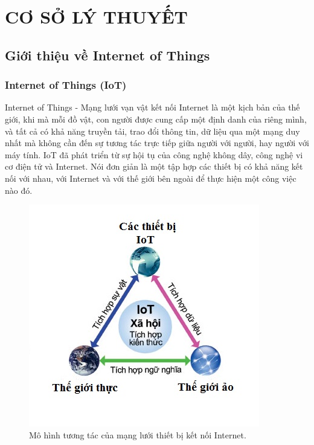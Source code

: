 \documentclass[a4paper,12pt,oneside]{article}
\begin{document}
\section{CƠ SỞ LÝ THUYẾT}

\subsection{Giới thiệu về Internet of Things}

\subsubsection{Internet of Things (IoT)}

\noindent Internet of Things - Mạng lưới vạn vật kết nối Internet là một kịch bản của thế giới, khi mà mỗi đồ vật, con người được cung cấp một định danh của riêng mình, và tất cả có khả năng truyền tải, trao đổi thông tin, dữ liệu qua một mạng duy nhất mà không cần đến sự tương tác trực tiếp giữa người với người, hay người với máy tính. IoT đã phát triển từ sự hội tụ của công nghệ không dây, công nghệ vi cơ điện tử và Internet. Nói đơn giản là một tập hợp các thiết bị có khả năng kết nối với nhau, với Internet và với thế giới bên ngoài để thực hiện một công việc nào đó.\\

\begin{center}
\begin{figure}[htp]
\begin{center}
\includegraphics[scale=1]{hinh/IoT_intro.jpg}
\end{center}
\caption{Mô hình tương tác của mạng lưới thiết bị kết nối Internet.}

\end{figure}
\end{center}
\end{document}
